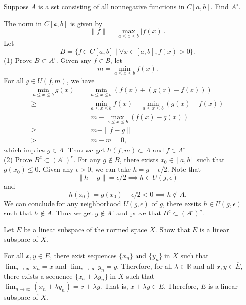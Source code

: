\documentclass[12pt,letterpaper,boxed]{hmcpset}
\begin{document}
\begin{problem}[1.11]
	Suppose $A$ is a set consisting of all nonnegative functions in $C[a,b]$. Find $A^\circ$.
\end{problem}
\begin{solution}
	The norm in $C[a,b]$ is given by
	\[
		\|f\|=\max_{a\le x\le b}|f(x)|.
	\]
	Let
	\[
		B=\{f\in C[a,b]\mid \forall x\in[a,b], f(x)>0\}.
	\]
	(1) Prove $B\subset A^\circ$.
	Given any $f\in B$, let
	\[
		m=\min_{a\le x\le b}f(x).
	\]
	For all $g\in U(f,m)$, we have
	\begin{align*}
		\min_{a\le x\le b} g(x)=&\min_{a\le x\le b}(f(x)+(g(x)-f(x)))\\
		\ge&\min_{a\le x\le b}f(x)+\min_{a\le x\le b}(g(x)-f(x))\\
		=&\;m-\max_{a\le x\le b}(f(x)-g(x))\\
		\ge&\;m-\|f-g\|\\
		>&\;m-m=0,
	\end{align*}
	which implies $g\in A$. Thus we get $U(f,m)\subset A$ and $f\in A^\circ$.~\\

	\noindent(2) Prove $B^c\subset\left(A^\circ\right)^c$.
	For any $g\notin B$, there exists $x_0\in[a,b]$ such that $g(x_0)\le0$. Given any $\epsilon>0$, we can take $h=g-\epsilon/2$. Note that
	\[
		\|h-g\|=\epsilon/2\implies h\in U(g,\epsilon)
	\]
	and
	\[
		h(x_0)=g(x_0)-\epsilon/2<0\implies h\notin A.
	\]
	We can conclude for any neighborhood  $U(g,\epsilon)$ of $g$, there exsits $h\in U(g,\epsilon)$ such that $h\notin A$. Thus we get $g\notin A^\circ$ and prove that $B^c\subset\left(A^\circ\right)^c$.
\end{solution}

\begin{problem}[1.13]
	Let $E$ be a linear subspace of the normed space $X$. Show that $\overline{E}$ is a linear subspace of $X$.
\end{problem}
\begin{solution}
	For all $x,y\in \overline{E}$, there exist sequences $\{x_n\}$ and $\{y_n\}$ in $X$ such that $\lim_{n\to\infty}x_n=x$ and $\lim_{n\to\infty}y_n=y$. Therefore, for all $\lambda \in \mathbb{R}$ and all $x,y\in \overline{E}$, there exists a sequence $\{x_n+\lambda y_n\}$ in $X$ such that $\lim_{n\to\infty}\left(x_n+\lambda y_n\right)=x+\lambda y$. That is, $x+\lambda y\in \overline{E}$. Therefore, $\overline{E}$ is a linear subspace of $X$.
\end{solution}
\end{document}
